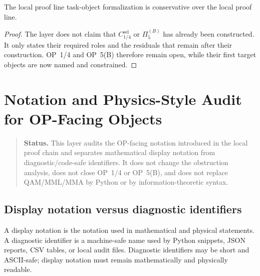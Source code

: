 \begin{theorem}
\label{thm:v410r04-task-object-formalization-conservativity}
The local proof line task-object formalization is conservative over the local proof line.
\end{theorem}

\begin{proof}
The layer does not claim that $C_{1/4}^{\mathrm{sel}}$ or $\Pi_{5}^{(B)}$ has already been
constructed. It only states their required roles and the residuals that remain
after their construction. OP~1/4 and OP~5(B) therefore remain open, while their
first target objects are now named and constrained.
\end{proof}



\clearpage
\section{Notation and Physics-Style Audit for OP-Facing Objects}
\label{sec:v410r05-notation-physics-style-audit}

\begin{quote}\small
\noindent\textbf{Status.}
This layer audits the OP-facing notation introduced in the local proof chain and separates
mathematical display notation from diagnostic/code-safe identifiers. It does
not change the obstruction analysis, does not close OP~1/4 or OP~5(B), and
does not replace QAM/MML/MMA by Python or by information-theoretic syntax.
\end{quote}

\subsection{Display notation versus diagnostic identifiers}
\label{subsec:v410r05-display-notation-versus-diagnostic-identifiers}

\begin{definition}
\label{def:v410r05-display-notation-diagnostic-identifier}
A display notation is the notation used in mathematical and physical statements.
A diagnostic identifier is a machine-safe name used by Python snippets, JSON
reports, CSV tables, or local audit files. Diagnostic identifiers may be short
and ASCII-safe; display notation must remain mathematically and physically
readable.
\end{definition}

